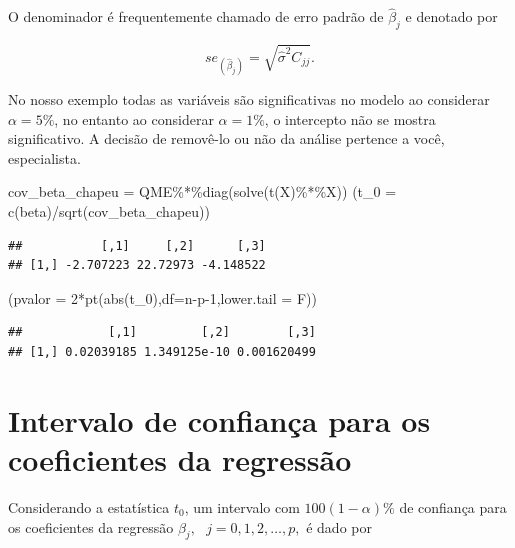 \documentclass[
]{book}
\newenvironment{Shaded}{\begin{snugshade}}{\end{snugshade}}
\newcommand{\AttributeTok}[1]{\textcolor[rgb]{0.77,0.63,0.00}{#1}}
\newcommand{\DecValTok}[1]{\textcolor[rgb]{0.00,0.00,0.81}{#1}}
\newcommand{\FunctionTok}[1]{\textcolor[rgb]{0.00,0.00,0.00}{#1}}
\newcommand{\NormalTok}[1]{#1}
\newcommand{\OtherTok}[1]{\textcolor[rgb]{0.56,0.35,0.01}{#1}}
\newcommand{\SpecialCharTok}[1]{\textcolor[rgb]{0.00,0.00,0.00}{#1}}
\begin{document}
O denominador é frequentemente chamado de erro padrão de \(\widehat{\beta}_j\) e denotado por

\[se_{(\widehat{\beta}_j)}=\sqrt{\widehat{\sigma}^2C_{jj}}.\]

No nosso exemplo todas as variáveis são significativas no modelo ao considerar \(\alpha=5\%\), no entanto ao considerar \(\alpha=1\%\), o intercepto não se mostra significativo. A decisão de removê-lo ou não da análise pertence a você, especialista.

\begin{Shaded}
\begin{Highlighting}[]
\NormalTok{cov\_beta\_chapeu }\OtherTok{=}\NormalTok{ QME}\SpecialCharTok{\%*\%}\FunctionTok{diag}\NormalTok{(}\FunctionTok{solve}\NormalTok{(}\FunctionTok{t}\NormalTok{(X)}\SpecialCharTok{\%*\%}\NormalTok{X))}
\NormalTok{(}\AttributeTok{t\_0 =} \FunctionTok{c}\NormalTok{(beta)}\SpecialCharTok{/}\FunctionTok{sqrt}\NormalTok{(cov\_beta\_chapeu))}
\end{Highlighting}
\end{Shaded}

\begin{verbatim}
##           [,1]     [,2]      [,3]
## [1,] -2.707223 22.72973 -4.148522
\end{verbatim}

\begin{Shaded}
\begin{Highlighting}[]
\NormalTok{(}\AttributeTok{pvalor =} \DecValTok{2}\SpecialCharTok{*}\FunctionTok{pt}\NormalTok{(}\FunctionTok{abs}\NormalTok{(t\_0),}\AttributeTok{df=}\NormalTok{n}\SpecialCharTok{{-}}\NormalTok{p}\DecValTok{{-}1}\NormalTok{,}\AttributeTok{lower.tail =}\NormalTok{ F))}
\end{Highlighting}
\end{Shaded}

\begin{verbatim}
##            [,1]         [,2]        [,3]
## [1,] 0.02039185 1.349125e-10 0.001620499
\end{verbatim}

\hypertarget{intervalo-de-confianuxe7a-para-os-coeficientes-da-regressuxe3o}{%
\section{Intervalo de confiança para os coeficientes da regressão}\label{intervalo-de-confianuxe7a-para-os-coeficientes-da-regressuxe3o}}

Considerando a estatística \(t_0\), um intervalo com \(100(1-\alpha)\%\) de confiança para os coeficientes da regressão \(\beta_j,~~~j=0,1,2,\ldots,p,\) é dado por
\end{document}
